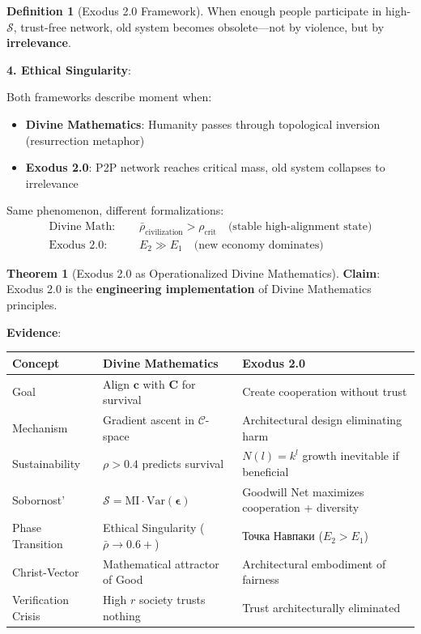 \documentclass[11pt,a4paper]{article}
\theoremstyle{definition}
\newtheorem{definition}{Definition}[section]
\newtheorem{theorem}{Theorem}[section]
\theoremstyle{remark}
\newcommand{\CC}{\mathcal{C}}
\newcommand{\cc}{\mathbf{c}}
\begin{document}
\begin{small}
\begin{enumerate}
\begin{definition}[Exodus 2.0 Framework]
When enough people participate in high-\(\mathcal{S}\), trust-free network, old system becomes obsolete—not by violence, but by \textbf{irrelevance}.

\textbf{4. Ethical Singularity}:

Both frameworks describe moment when:
\begin{itemize}
    \item \textbf{Divine Mathematics}: Humanity passes through topological inversion (resurrection metaphor)
    \item \textbf{Exodus 2.0}: P2P network reaches critical mass, old system collapses to irrelevance
\end{itemize}

Same phenomenon, different formalizations:
\begin{align}
\text{Divine Math: } \quad &\bar{\rho}_{\text{civilization}} > \rho_{\text{crit}} \quad \text{(stable high-alignment state)} \\
\text{Exodus 2.0: } \quad &E_2 \gg E_1 \quad \text{(new economy dominates)}
\end{align}
\end{definition}

\begin{theorem}[Exodus 2.0 as Operationalized Divine Mathematics]
\textbf{Claim}: Exodus 2.0 is the \textbf{engineering implementation} of Divine Mathematics principles.

\textbf{Evidence}:

\begin{tabular}{|p{3.5cm}|p{5cm}|p{5cm}|}
\hline
\textbf{Concept} & \textbf{Divine Mathematics} & \textbf{Exodus 2.0} \\
\hline
Goal & Align \(\cc\) with \(\mathbf{C}\) for survival & Create cooperation without trust \\
\hline
Mechanism & Gradient ascent in \(\CC\)-space & Architectural design eliminating harm \\
\hline
Sustainability & \(\rho > 0.4\) predicts survival & \(N(l) = k^l\) growth inevitable if beneficial \\
\hline
Sobornost' & \(\mathcal{S} = \text{MI} \cdot \text{Var}(\boldsymbol{\epsilon})\) & Goodwill Net maximizes cooperation + diversity \\
\hline
Phase Transition & Ethical Singularity (\(\bar{\rho} \to 0.6+\)) & Точка Навпаки (\(E_2 > E_1\)) \\
\hline
Christ-Vector & Mathematical attractor of Good & Architectural embodiment of fairness \\
\hline
Verification Crisis & High \(r\) society trusts nothing & Trust architecturally eliminated \\
\hline
\end{tabular}


\end{theorem}
\end{enumerate}
\end{small}
\end{document}
